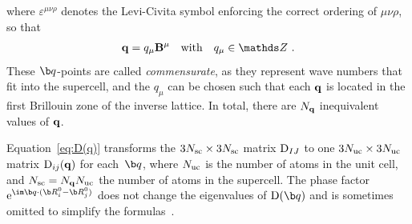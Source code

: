 where $\varepsilon^{\mu \nu \rho}$ denotes the Levi-Civita symbol enforcing the correct ordering of $\mu \nu \rho$, so that
\begin{align}
{\bf q} %
= %
q_\mu {\bf B}^\mu\quad\text{with}\quad q_\mu \in \mathds Z~.
\label{eq:q_m}
\end{align}
These $\b q$-points are called \emph{commensurate}, as they represent wave numbers that fit into the supercell, and the $q_\mu$ can be chosen such that each $\bf q$ is located in the first Brillouin zone of the inverse lattice. In total, there are $N_{\bf q}$ inequivalent values of $\bf q$.

Equation~\eqref{eq:D(q)} transforms the $3N_{\rm sc} \times 3N_{\rm sc}$ matrix ${\rm D}_{IJ}$ to one $3N_{\rm uc} \times 3N_{\rm uc}$ matrix ${\rm D}_{ij} (\bf q)$ for each~$\b q$, where $N_{\rm uc}$ is the number of atoms in the unit cell, and $N_{\rm sc} = N_{\bf q} N_{\rm uc}$ the number of atoms in the supercell. 
The phase factor ${\rm e}^{\im \b q \cdot (\b R_i^0 - \b R_j^0)}$ does not change the eigenvalues of ${\rm D} (\b q)$ and is sometimes omitted to simplify the formulas~\cite{BornHuang}.

